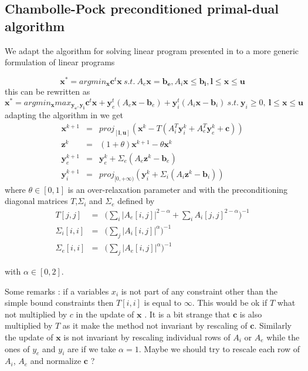\documentclass[11pt]{article}
\begin{document}
\subsection{Chambolle-Pock preconditioned primal-dual algorithm}
We adapt the algorithm for solving linear program presented in \cite{Chambolle2011} to a more generic formulation of linear programs


\begin{equation}
\mathbf{x}^*=argmin_\mathbf{x} \mathbf{c}^t\mathbf{x} ~  s.t.~  A_e\mathbf{x}=\mathbf{b_e},A_i\mathbf{x}\leq\mathbf{ b_i}, \mathbf{l}\leq \mathbf{x}\leq \mathbf{u} 
\end{equation}
this can be rewritten as 
\begin{equation}
\mathbf{x}^*=argmin_\mathbf{x} max_{\mathbf{y_e},\mathbf{y_i}}\mathbf{c}^t\mathbf{x}+\mathbf{y}_e^t(A_e\mathbf{x}-\mathbf{b}_e)+ \mathbf{y}_i^t(A_i\mathbf{x}-\mathbf{b}_i)~  s.t.~ \mathbf{y}_i\geq 0,~ \mathbf{l}\leq \mathbf{x}\leq \mathbf{u} 
\end{equation}
adapting the algorithm in \cite{Chambolle2011}  we get
\begin{eqnarray}
\mathbf{x}^{k+1}&=&proj_{[\mathbf{l},\mathbf{u}]} (\mathbf{x}^k-T(A_i^T\mathbf{y}_i^k+A_e^T\mathbf{y}_e^k+\mathbf{c}))\\
\mathbf{z}^k&=&(1+\theta)\mathbf{x}^{k+1}-\theta \mathbf{x}^k\\
\mathbf{y}_e^{k+1}&=&\mathbf{y}_e^k+\Sigma_e(A_e \mathbf{z}^k-\mathbf{b}_e)\\
\mathbf{y}_i^{k+1}&=&proj_{[0,+\infty)}(\mathbf{y}_i^k+\Sigma_i(A_i \mathbf{z}^k-\mathbf{b}_i))
\end{eqnarray}
where $\theta\in[0,1]$ is an over-relaxation parameter and with the preconditioning diagonal matrices $T$,$\Sigma_i$ and $\Sigma_e$ defined by
\begin{eqnarray}
T[j,j]&=&\big(\sum_i |A_e[i,j]|^{2-\alpha}+\sum_i A_i[j,j]^{2-\alpha}\big)^{-1}\\
\Sigma_i[i,i]&=&\big(\sum_j |A_i[i,j]|^{\alpha}\big)^{-1}\\
\Sigma_e[i,i]&=&\big(\sum_j |A_e[i,j]|^{\alpha}\big)^{-1}
\end{eqnarray}

with $\alpha\in[0,2]$.


Some remarks : if a variables $x_i$ is  not part of any constraint other than the simple bound constraints then  $T[i,i]$ is equal to $\infty$. This would be ok if $T$ what not multiplied by $c$ in the update of $\mathbf{x}$ .
It is a bit strange that $\mathbf{c}$ is also multiplied by $T$ as it make the method not invariant by rescaling of $\mathbf{c}$. Similarly the update of $\mathbf{x}$ is not invariant by rescaling individual rows of $A_i$ or $A_e$
while the ones of $y_e$ and $y_i$ are if we take $\alpha=1$.
Maybe we should try to rescale each row of $A_i$, $A_e$ and normalize $\mathbf{c}$ ?
\end{document}
